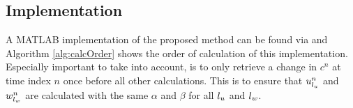 \subsection{Implementation}
A MATLAB implementation of the proposed method can be found via \cite{MATLABcode} and Algorithm \ref{alg:calcOrder} shows the order of calculation of this implementation. Especially important to take into account, is to only retrieve a change in $c^n$ at time index $n$ once before all other calculations. This is to ensure that $u_{l_u}^n$ and $w_{l_w}^n$ are calculated with the same $\alpha$ and $\beta$ for all ${l_u}$ and ${l_w}$.
\begin{algorithm}[ht]
\end{algorithm}
